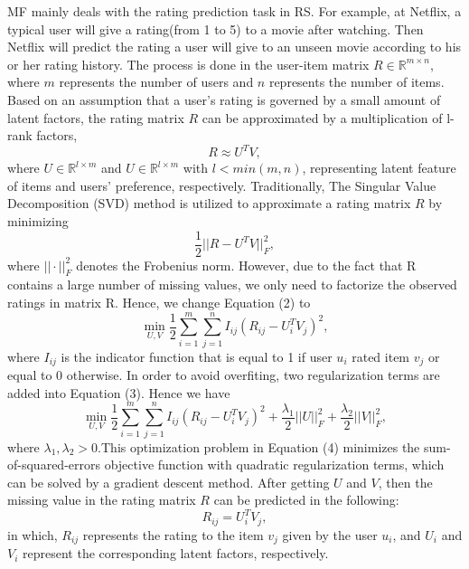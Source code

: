 MF mainly deals with the rating prediction task in RS. For example, at Netflix, a typical user will give a rating(from 1 to 5) to a movie after watching. Then Netflix will predict the rating a user will give to an unseen movie according to his or her rating history. The process is done in the user-item matrix  $R \in \mathbb{R}^{m \times n}$, where $m$ represents the number of users and $n$ represents the number of items. Based on an assumption that a user's rating is governed by a small amount of latent factors, the rating matrix $R$ can be approximated by a multiplication of l-rank factors,
\begin{equation}
R \approx U^TV,
\end{equation}
where $U \in \mathbb{R}^{l \times m}$ and {$U \in \mathbb{R}^{l \times m}$} with $l < min(m, n)$, representing latent feature of items and users' preference, respectively. Traditionally, The Singular Value Decomposition (SVD) method is utilized to approximate a rating matrix $R$ by minimizing
\begin{equation}
\frac{1}{2}||R - U^TV||_F^2,
\end{equation}
where $||\cdot||_F^2$ denotes the Frobenius norm. However, due to the fact that R contains a large number of missing values, we only need to factorize the observed ratings in matrix R. Hence, we change Equation (2) to
\begin{equation}
\min_{U,V}\frac{1}{2}\sum_{i=1}^{m}\sum_{j=1}^{n}I_{ij}(R_{ij} - U_i^TV_j)^2,
\end{equation} 
where $I_{ij}$ is the indicator function that is equal to 1 if user $u_i$ rated item $v_j$ or equal to 0 otherwise. In order to avoid overfiting, two regularization terms are added into Equation (3). Hence we have
\begin{equation}
\min_{U,V}\frac{1}{2}\sum_{i=1}^{m}\sum_{j=1}^{n}I_{ij}(R_{ij} - U_i^TV_j)^2 + \frac{\lambda_1}{2}||U||_F^2 + \frac{\lambda_2}{2}||V||_F^2,
\end{equation} 
where $\lambda_1, \lambda_2 > 0 $.This optimization problem in Equation (4) minimizes the sum-of-squared-errors objective function with quadratic regularization terms, which can be solved by a gradient descent method. After getting $U$ and $V$, then the missing value in the rating matrix $R$ can be predicted in the following:
\begin{equation}
R_{ij} = U_i^TV_j,
\end{equation}
in which, $R_{ij}$ represents the rating to the item $v_j$ given by the user $u_i$, and $U_i$ and $V_i$ represent the corresponding latent factors, respectively.

